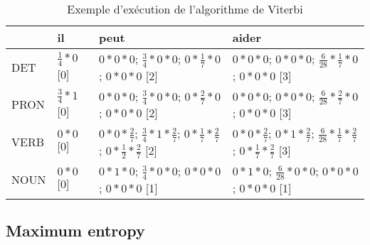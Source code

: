 \documentclass{KodeBook}
\begin{document}
\begin{table}[ht]
	\centering\footnotesize%
	\begin{tabular}{llll}
		\cline{2-4}\noalign{\vskip\doublerulesep
			\vskip-\arrayrulewidth}\cline{2-4}
		& il & peut & aider \\
		\hline
		DET  & $\frac{1}{4} * 0$ [0]& $0 * 0 * 0$; $\frac{3}{4} * 0 * 0$; $0 * \frac{1}{7} * 0$; $0 * 0 * 0$ [2] & $0 * 0 * 0$; $0 * 0 * 0$; $\frac{6}{28} * \frac{1}{7} * 0$; $0 * 0 * 0$ [3]\\
		PRON & $\frac{3}{4} * 1$ [0]&  $0 * 0 * 0$; $\frac{3}{4} * 0 * 0$; $0 * \frac{2}{7} * 0$; $0 * 0 * 0$ [2]&  $0 * 0 * 0$; $0 * 0 * 0$; $\frac{6}{28} * \frac{2}{7} * 0$; $0 * 0 * 0$ [3]\\
		VERB & $0 * 0$ [0]& $0 * 0 * \frac{2}{7}$; $\frac{3}{4} * 1 * \frac{2}{7}$; $0 * \frac{1}{7} * \frac{2}{7}$; $0 * \frac{1}{2} * \frac{2}{7}$ [2]& $0 * 0 * \frac{2}{7}$; $0 * 1 * \frac{2}{7}$; $\frac{6}{28} * \frac{1}{7} * \frac{2}{7}$; $0 * \frac{1}{7} * \frac{2}{7}$ [3]\\
		NOUN & $0 * 0$ [0]& $0 * 1 * 0$; $\frac{3}{4} * 0 * 0$; $0 * 0 * 0$; $0 * 0 * 0$ [1]& $0 * 1 * 0$; $\frac{6}{28} * 0 * 0$; $0 * 0 * 0$; $0 * 0 * 0$ [1]\\
		\hline\hline
	\end{tabular}
	\caption[Exemple d'exécution de l'algorithme de Viterbi]{Exemple d'exécution de l'algorithme de Viterbi \label{tab:hmm-viterbi-exp}}
\end{table}


\subsection{Maximum entropy}
\end{document}
